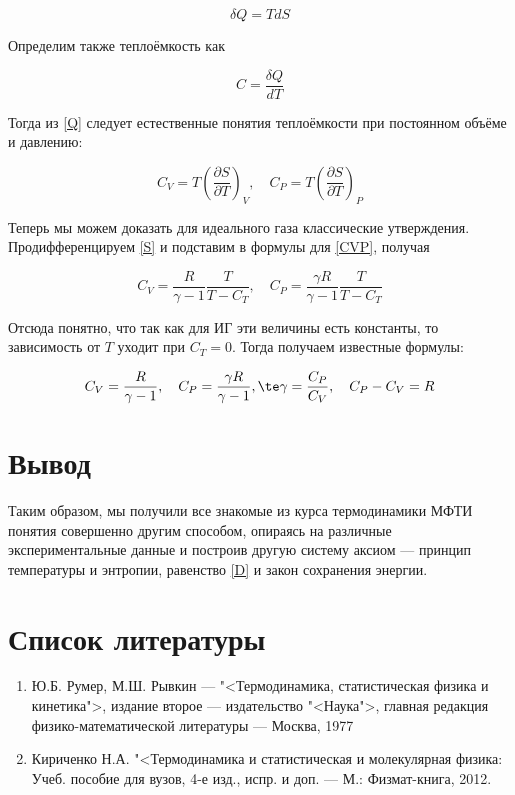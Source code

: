\documentclass[12pt]{kiarticle}
\newcommand{\del}{\ensuremath{\delta}}
\newcommand{\spdd}[2]{\left( \frac{\partial #1}{\partial #2} \right)}
\begin{document}
\begin{equation}\label{Q}
\del Q = TdS
\end{equation}

Определим также теплоёмкость как 

\begin{equation}\label{}
C = \dfrac{\del Q}{dT}
\end{equation}

Тогда из \eqref{Q} следует естественные понятия теплоёмкости при постоянном объёме и давлению:

\begin{equation} \label{CVP}
C_V = T \spdd{S}{T}_V, \quad C_P = T \spdd{S}{T}_P
\end{equation} 

Теперь мы можем доказать для идеального газа классические утверждения. Продифференцируем \eqref{S} и подставим в формулы для \eqref{CVP}, получая

\begin{equation}\label{}
C_V = \dfrac{R}{\gamma - 1} \dfrac{T}{T - C_T}, \quad C_P = \dfrac{\gamma R}{\gamma - 1} \dfrac{T}{T - C_T} 
\end{equation}

Отсюда понятно, что так как для ИГ эти величины есть константы, то зависимость от $ T $ уходит при $ C_T = 0 $. Тогда получаем известные формулы:

\begin{equation}\label{}
C_V = \dfrac{R}{\gamma - 1},  \quad C_P = \dfrac{\gamma R}{\gamma - 1}, \te \gamma = \dfrac{C_P}{C_V}, \quad C_P - C_V = R
\end{equation}


\section{Вывод}

Таким образом, мы получили все знакомые из курса термодинамики МФТИ понятия совершенно другим способом, опираясь на различные экспериментальные данные и построив другую систему аксиом --- принцип температуры и энтропии, равенство \eqref{D} и  закон сохранения энергии.






\section*{Список литературы}

\begin{enumerate}
	
	\item Ю.Б. Румер, М.Ш. Рывкин --- "<Термодинамика, статистическая физика и кинетика">, издание второе ---  издательство "<Наука">, главная редакция физико-математической литературы --- Москва, 1977 
	
	\item Кириченко Н.А. "<Термодинамика и статистическая и молекулярная физика: Учеб. пособие для вузов, 4-е изд., испр. и доп. --- М.: Физмат-книга, 2012. 
	
\end{enumerate}
\end{document}
